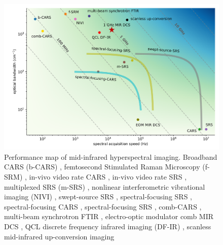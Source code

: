 \documentclass{optica-article}
\begin{document}
\begin{figure}[h]
    \centering
    \includegraphics[width=\linewidth]{bckgnd_with_cm_v3.png}
    \caption{Performance map of mid-infrared hyperspectral imaging. Broadband CARS (b-CARS) \cite{keeSimpleApproachOnelaser2004}, femtosecond Stimulated Raman Microscopy (f-SRM) \cite{ploetzFemtosecondStimulatedRaman2007}, in-vivo video rate CARS \cite{evansChemicalImagingTissue2005}, in-vivo video rate SRS \cite{saarVideoRateMolecularImaging2010}, multiplexed SRS (m-SRS) \cite{fuQuantitativeChemicalImaging2012,liaoMicrosecondScaleVibrational2015}, nonlinear interferometric vibrational imaging (NIVI) \cite{chowdaryMolecularHistopathologySpectrally2010}, swept-source SRS \cite{ozekiHighspeedMolecularSpectral2012}, spectral-focusing SRS \cite{fuHyperspectralImagingStimulated2013}, spectral-focusing CARS \cite{dinapoliHyperspectralDifferentialCARS2014}, spectral-focusing SRS \cite{linMicrosecondFingerprintStimulated2021}, comb-CARS \cite{ideguchiCoherentRamanSpectroimaging2013}, multi-beam synchrotron FTIR \cite{nasseHighresolutionFouriertransformInfrared2011}, electro-optic modulator comb MIR DCS \cite{ullahkhanDirectHyperspectralDualcomb2020}, QCL discrete frequency infrared imaging (DF-IR) \cite{yehFastInfraredChemical2015}, scanless mid-infrared up-conversion imaging \cite{zhaoHighspeedScanlessEntire2023}}
    \label{fig:bckgnd}
\end{figure}

\end{document}
